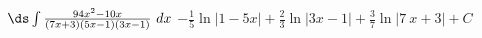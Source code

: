 {$\ds \int \frac{94x^2-10x}{(7x+3)(5x-1)(3x-1)}\ dx$}
{$-\frac{1}{5} \ln |1-5 x|+\frac{2}{3} \ln |3 x-1|+\frac{3}{7} \ln |7 \
x+3|+C$}
